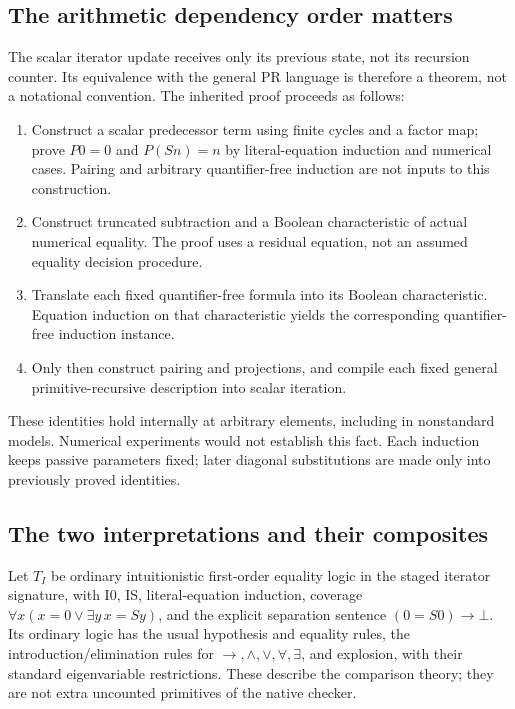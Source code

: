 \documentclass[11pt,letterpaper]{article}
\theoremstyle{definition}\newtheorem{definition}[theorem]{Definition}
\theoremstyle{remark}\newtheorem{remark}[theorem]{Remark}
\begin{document}
\subsection{The arithmetic dependency order matters}

The scalar iterator update receives only its previous state, not its
recursion counter. Its equivalence with the general PR language is
therefore a theorem, not a notational convention. The inherited proof
proceeds as follows:
\begin{enumerate}
\item Construct a scalar predecessor term using finite cycles and a
factor map; prove $P0=0$ and $P(Sn)=n$ by literal-equation induction
and numerical cases. Pairing and arbitrary quantifier-free induction
are not inputs to this construction.
\item Construct truncated subtraction and a Boolean characteristic
of actual numerical equality. The proof uses a residual equation,
not an assumed equality decision procedure.
\item Translate each fixed quantifier-free formula into its Boolean
characteristic. Equation induction on that characteristic yields the
corresponding quantifier-free induction instance.
\item Only then construct pairing and projections, and compile each
fixed general primitive-recursive description into scalar iteration.
\end{enumerate}
These identities hold internally at arbitrary elements, including in
nonstandard models. Numerical experiments would not establish this
fact. Each induction keeps passive parameters fixed; later diagonal
substitutions are made only into previously proved identities.

\subsection{The two interpretations and their composites}

Let $T_I$ be ordinary intuitionistic first-order equality logic in the
staged iterator signature, with I0, IS, literal-equation induction,
coverage $\forall x(x=0\vee\exists y\,x=Sy)$, and the explicit
separation sentence $(0=S0)\to\bot$. Its ordinary logic has the usual
hypothesis and equality rules, the introduction/elimination rules for
$\to,\wedge,\vee,\forall,\exists$, and explosion, with their standard
eigenvariable restrictions. These describe the comparison theory; they
are not extra uncounted primitives of the native checker.
\end{document}
